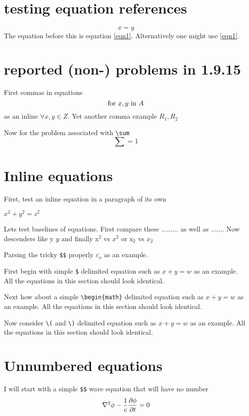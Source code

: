 \documentclass{article}
\begin{document}
\section{testing equation references}
\begin{equation}
x=y
\label{eqn1}
\end{equation}
The equation before this is equation \ref{eqn1}.  Alternatively
one might use \eqref{eqn1}.

\section{reported (non-) problems in 1.9.15}
First commas in equations
$$
\hbox{for } x,y \hbox{ in } A
$$
as an inline $\forall x, y \in Z$.  Yet another comma example
$R_1, R_2$ 

Now for the problem associated with \verb#\sum#
$$
\sum = 1
$$

\section{Inline equations}
First, test an inline equation in a paragraph of its own

$x^2+y^2=z^2$

Lets test baselines of equations.  First compare these ...$\ldots$... as
well as ...$.$...  Now descenders like y $y$ and finally x$^2$ vs $x^2$ or
x$_2$ vs $x_2$

Parsing the tricky \verb#$$# properly $\varepsilon $$_o$ as an example.

First begin with simple \verb#$# delimited equation such as
$x+y=w$ as an example.  All the equations in this section should
look identical.

Next how about a simple \verb#\begin{math}# delimited equation such as
\begin{math}x+y=w\end{math} as an example.  All the equations in this section should
look identical.

Now consider \verb#\(# and \verb#\)# delimited equation such as
\(x+y=w\) as an example.  All the equations in this section should
look identical.

\section{Unnumbered equations}

I will start with a simple \verb#$$# wave equation
that will have no number
$$
\nabla^2 \phi -{1\over c} {\partial \phi\over \partial t}  = 0
$$
\end{document}

